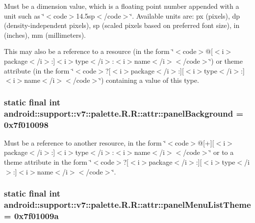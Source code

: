 Must be a dimension value, which is a floating point number appended with a unit such as \char`\"{}$<$code$>$14.5sp$<$/code$>$\char`\"{}. Available units are: px (pixels), dp (density-independent pixels), sp (scaled pixels based on preferred font size), in (inches), mm (millimeters). 

This may also be a reference to a resource (in the form \char`\"{}$<$code$>$@\mbox{[}$<$i$>$package$<$/i$>$:\mbox{]}$<$i$>$type$<$/i$>$:$<$i$>$name$<$/i$>$$<$/code$>$\char`\"{}) or theme attribute (in the form \char`\"{}$<$code$>$?\mbox{[}$<$i$>$package$<$/i$>$:\mbox{]}\mbox{[}$<$i$>$type$<$/i$>$:\mbox{]}$<$i$>$name$<$/i$>$$<$/code$>$\char`\"{}) containing a value of this type. \hypertarget{classandroid_1_1support_1_1v7_1_1palette_1_1_r_1_1attr_451d83354f4f220b41779e9f754918d3}{
\subsubsection[{panelBackground}]{\setlength{\rightskip}{0pt plus 5cm}static final int android::support::v7::palette.R.R::attr::panelBackground = 0x7f010098}}
\label{classandroid_1_1support_1_1v7_1_1palette_1_1_r_1_1attr_451d83354f4f220b41779e9f754918d3}


Must be a reference to another resource, in the form \char`\"{}$<$code$>$@\mbox{[}+\mbox{]}\mbox{[}$<$i$>$package$<$/i$>$:\mbox{]}$<$i$>$type$<$/i$>$:$<$i$>$name$<$/i$>$$<$/code$>$\char`\"{} or to a theme attribute in the form \char`\"{}$<$code$>$?\mbox{[}$<$i$>$package$<$/i$>$:\mbox{]}\mbox{[}$<$i$>$type$<$/i$>$:\mbox{]}$<$i$>$name$<$/i$>$$<$/code$>$\char`\"{}. \hypertarget{classandroid_1_1support_1_1v7_1_1palette_1_1_r_1_1attr_06f5b15d71d29f540b139d5195837550}{
\subsubsection[{panelMenuListTheme}]{\setlength{\rightskip}{0pt plus 5cm}static final int android::support::v7::palette.R.R::attr::panelMenuListTheme = 0x7f01009a}}
\label{classandroid_1_1support_1_1v7_1_1palette_1_1_r_1_1attr_06f5b15d71d29f540b139d5195837550}


